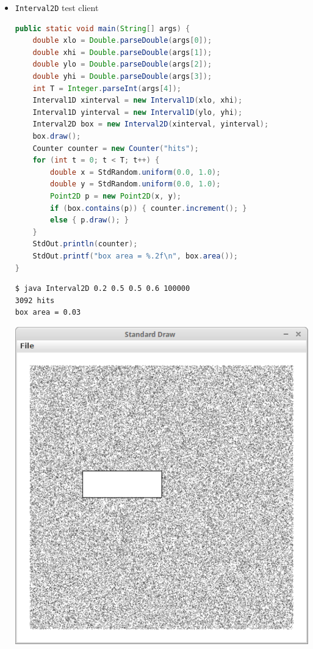\documentclass[8pt,a4paper,compress]{beamer}
\begin{document}
\begin{frame}[fragile]
\pause 
\begin{itemize}
\item \lstinline$Interval2D$ test client

\begin{lstlisting}[language=Java]
public static void main(String[] args) {
    double xlo = Double.parseDouble(args[0]);
    double xhi = Double.parseDouble(args[1]);
    double ylo = Double.parseDouble(args[2]);
    double yhi = Double.parseDouble(args[3]);
    int T = Integer.parseInt(args[4]);
    Interval1D xinterval = new Interval1D(xlo, xhi);
    Interval1D yinterval = new Interval1D(ylo, yhi);
    Interval2D box = new Interval2D(xinterval, yinterval);
    box.draw();
    Counter counter = new Counter("hits");
    for (int t = 0; t < T; t++) {
        double x = StdRandom.uniform(0.0, 1.0);
        double y = StdRandom.uniform(0.0, 1.0);
        Point2D p = new Point2D(x, y);
        if (box.contains(p)) { counter.increment(); }
        else { p.draw(); }
    }
    StdOut.println(counter);
    StdOut.printf("box area = %.2f\n", box.area());
}
\end{lstlisting}

\pause

\begin{minipage}{160pt}
\begin{lstlisting}[language=bash]
$ java Interval2D 0.2 0.5 0.5 0.6 100000
3092 hits
box area = 0.03
\end{lstlisting}
\end{minipage}%
\begin{minipage}{120pt}
\hfill \includegraphics[scale=0.15]{./figures/interval2D.pdf}
\end{minipage}
\end{itemize}
\end{frame}
\end{document}

